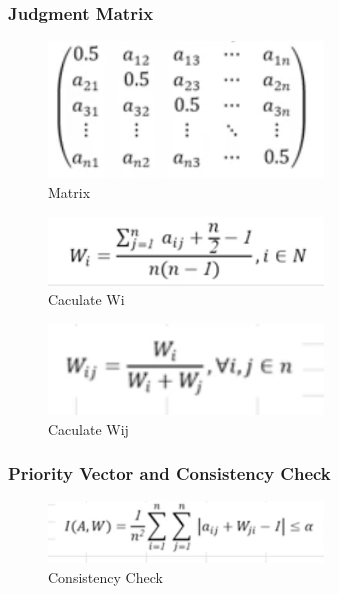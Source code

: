 \documentclass{article}
\begin{document}
\subsubsection{Judgment Matrix}
\newpage
\begin{figure}[htbp]
  \centering
  \includegraphics[width=0.65\textwidth]{pic05.png} %
  \caption{Matrix}
  \label{5}
\end{figure}

\begin{figure}[htbp]
  \centering
  \includegraphics[width=0.65\textwidth]{pic06.png} %
  \caption{Caculate Wi}
  \label{6}
\end{figure}

\begin{figure}[htbp]
  \centering
  \includegraphics[width=0.65\textwidth]{pic07.png} %
  \caption{Caculate Wij}
  \label{7}
\end{figure}


\subsubsection{Priority Vector and Consistency Check}
\newpage
\begin{figure}[htbp]
  \centering
  \includegraphics[width=0.65\textwidth]{pic08.png} %
  \caption{Consistency Check}
  \label{7}
\end{figure}
\end{document}
